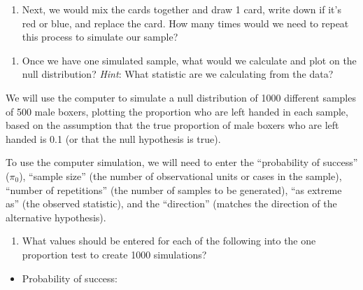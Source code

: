 \documentclass[
]{report}
\providecommand{\tightlist}{%
  \setlength{\itemsep}{0pt}\setlength{\parskip}{0pt}}
\begin{document}
\begin{enumerate}
\def\labelenumi{\arabic{enumi}.}
\setcounter{enumi}{14}
\tightlist
\item
  Next, we would mix the cards together and draw 1 card, write down if it's red or blue, and replace the card. How many times would we need to repeat this process to simulate our sample?
\end{enumerate}

\vspace{0.5in}

\begin{enumerate}
\def\labelenumi{\arabic{enumi}.}
\setcounter{enumi}{15}
\tightlist
\item
  Once we have one simulated sample, what would we calculate and plot on the null distribution? \emph{Hint}: What statistic are we calculating from the data?
\end{enumerate}

\vspace{1in}

We will use the computer to simulate a null distribution of 1000 different samples of 500 male boxers, plotting the proportion who are left handed in each sample, based on the assumption that the true proportion of male boxers who are left handed is 0.1 (or that the null hypothesis is true).

To use the computer simulation, we will need to enter the ``probability of success'' (\(\pi_0\)), ``sample size'' (the number of observational units or cases in the sample), ``number of repetitions'' (the number of samples to be generated), ``as extreme as'' (the observed statistic), and the ``direction'' (matches the direction of the alternative hypothesis).

\newpage

\begin{enumerate}
\def\labelenumi{\arabic{enumi}.}
\setcounter{enumi}{16}
\tightlist
\item
  What values should be entered for each of the following into the one proportion test to create 1000 simulations?
\end{enumerate}

\vspace{1mm}

\begin{itemize}
\tightlist
\item
  Probability of success:
\end{itemize}

\vspace{.2in}
\end{document}
